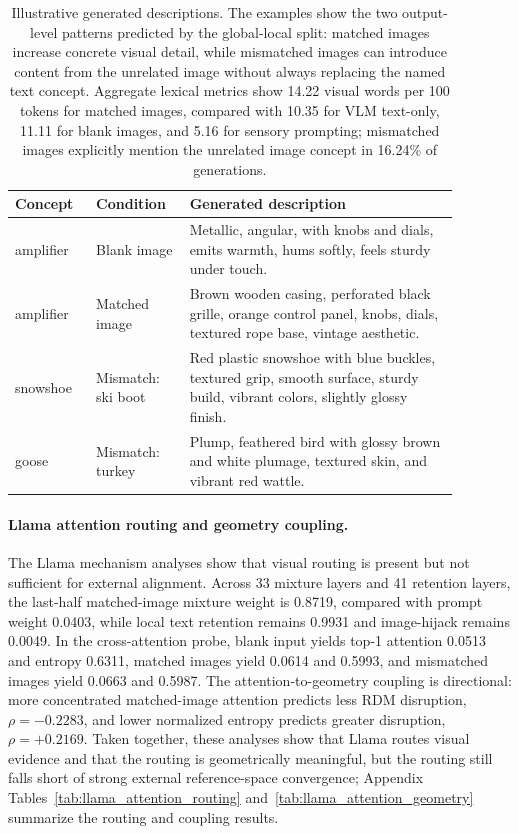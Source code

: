 \documentclass{article}
\begin{document}
\begin{table}[!htbp]
\centering
\caption{Illustrative generated descriptions. The examples show the two output-level patterns predicted by the global-local split: matched images increase concrete visual detail, while mismatched images can introduce content from the unrelated image without always replacing the named text concept. Aggregate lexical metrics show 14.22 visual words per 100 tokens for matched images, compared with 10.35 for VLM text-only, 11.11 for blank images, and 5.16 for sensory prompting; mismatched images explicitly mention the unrelated image concept in 16.24\% of generations.}
\label{tab:generated_description_examples}
\small
\begin{tabular}{p{0.16\linewidth}p{0.18\linewidth}p{0.54\linewidth}}
\toprule
Concept & Condition & Generated description \\
\midrule
amplifier & Blank image & Metallic, angular, with knobs and dials, emits warmth, hums softly, feels sturdy under touch. \\
amplifier & Matched image & Brown wooden casing, perforated black grille, orange control panel, knobs, dials, textured rope base, vintage aesthetic. \\
snowshoe & Mismatch: ski boot & Red plastic snowshoe with blue buckles, textured grip, smooth surface, sturdy build, vibrant colors, slightly glossy finish. \\
goose & Mismatch: turkey & Plump, feathered bird with glossy brown and white plumage, textured skin, and vibrant red wattle. \\
\bottomrule
\end{tabular}
\end{table}

\paragraph{Llama attention routing and geometry coupling.}
The Llama mechanism analyses show that visual routing is present but not sufficient for external alignment. Across 33 mixture layers and 41 retention layers, the last-half matched-image mixture weight is 0.8719, compared with prompt weight 0.0403, while local text retention remains 0.9931 and image-hijack remains 0.0049. In the cross-attention probe, blank input yields top-1 attention 0.0513 and entropy 0.6311, matched images yield 0.0614 and 0.5993, and mismatched images yield 0.0663 and 0.5987. The attention-to-geometry coupling is directional: more concentrated matched-image attention predicts less RDM disruption, \(\rho=-0.2283\), and lower normalized entropy predicts greater disruption, \(\rho=+0.2169\). Taken together, these analyses show that Llama routes visual evidence and that the routing is geometrically meaningful, but the routing still falls short of strong external reference-space convergence; Appendix Tables~\ref{tab:llama_attention_routing} and~\ref{tab:llama_attention_geometry} summarize the routing and coupling results.
\end{document}
